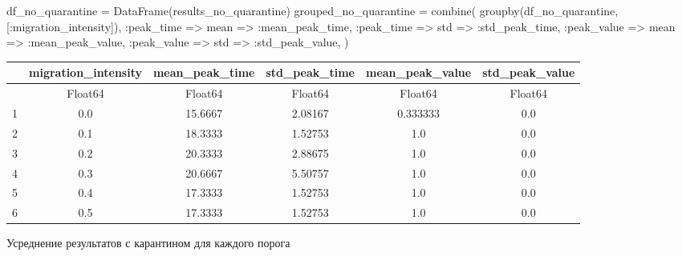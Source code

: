 \documentclass[
  12pt,
  a4paper,
  DIV=11,
  numbers=noendperiod]{scrreprt}
\newenvironment{Shaded}{\begin{snugshade}}{\end{snugshade}}
\newcommand{\FunctionTok}[1]{\textcolor[rgb]{0.28,0.35,0.67}{#1}}
\newcommand{\NormalTok}[1]{\textcolor[rgb]{0.00,0.23,0.31}{#1}}
\newcommand{\OperatorTok}[1]{\textcolor[rgb]{0.37,0.37,0.37}{#1}}
\begin{document}
\begin{Shaded}
\begin{Highlighting}[]
\NormalTok{df\_no\_quarantine }\OperatorTok{=} \FunctionTok{DataFrame}\NormalTok{(results\_no\_quarantine)}
\NormalTok{grouped\_no\_quarantine }\OperatorTok{=} \FunctionTok{combine}\NormalTok{(}
    \FunctionTok{groupby}\NormalTok{(df\_no\_quarantine, [}\OperatorTok{:}\NormalTok{migration\_intensity]),}
    \OperatorTok{:}\NormalTok{peak\_time }\OperatorTok{=\textgreater{}}\NormalTok{ mean }\OperatorTok{=\textgreater{}} \OperatorTok{:}\NormalTok{mean\_peak\_time,}
    \OperatorTok{:}\NormalTok{peak\_time }\OperatorTok{=\textgreater{}}\NormalTok{ std }\OperatorTok{=\textgreater{}} \OperatorTok{:}\NormalTok{std\_peak\_time,}
    \OperatorTok{:}\NormalTok{peak\_value }\OperatorTok{=\textgreater{}}\NormalTok{ mean }\OperatorTok{=\textgreater{}} \OperatorTok{:}\NormalTok{mean\_peak\_value,}
    \OperatorTok{:}\NormalTok{peak\_value }\OperatorTok{=\textgreater{}}\NormalTok{ std }\OperatorTok{=\textgreater{}} \OperatorTok{:}\NormalTok{std\_peak\_value,}
\NormalTok{)}
\end{Highlighting}
\end{Shaded}

\begin{tabular}{r|ccccc}
    & migration\_intensity & mean\_peak\_time & std\_peak\_time & mean\_peak\_value & std\_peak\_value\\
    \hline
    & Float64 & Float64 & Float64 & Float64 & Float64\\
    \hline
    1 & 0.0 & 15.6667 & 2.08167 & 0.333333 & 0.0 \\
    2 & 0.1 & 18.3333 & 1.52753 & 1.0 & 0.0 \\
    3 & 0.2 & 20.3333 & 2.88675 & 1.0 & 0.0 \\
    4 & 0.3 & 20.6667 & 5.50757 & 1.0 & 0.0 \\
    5 & 0.4 & 17.3333 & 1.52753 & 1.0 & 0.0 \\
    6 & 0.5 & 17.3333 & 1.52753 & 1.0 & 0.0 \\
\end{tabular}

Усреднение результатов с карантином для каждого порога
\end{document}
